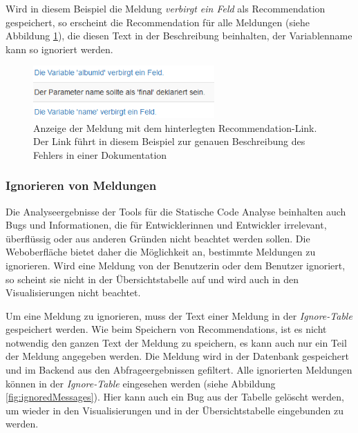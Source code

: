 Wird in diesem Beispiel die Meldung \textit{verbirgt ein Feld} als Recommendation gespeichert, so erscheint die Recommendation für alle Meldungen (siehe Abbildung \ref{fig:recommendations}), die diesen Text in der Beschreibung beinhalten, der Variablenname kann so ignoriert werden. 

\begin{figure}[tp]
  \centering
  \includegraphics[height=2cm]{images/recommendation.PNG}
 \caption[Anzeige der Meldung mit dem hinterlegten Recommendation-Link. Der Link führt in diesem Beispiel zur genauen Beschreibung des Fehlers in einer Dokumentation]{Anzeige der Meldung mit dem hinterlegten Recommendation-Link. Der Link führt in diesem Beispiel zur genauen Beschreibung des Fehlers in einer Dokumentation}
  \label{fig:recommendations}
\end{figure}

\subsubsection{Ignorieren von Meldungen}
Die Analyseergebnisse der Tools für die Statische Code Analyse beinhalten auch Bugs und Informationen, die für Entwicklerinnen und Entwickler irrelevant, überflüssig  oder aus anderen Gründen nicht beachtet werden sollen. Die Weboberfläche bietet daher die Möglichkeit an, bestimmte Meldungen zu ignorieren. Wird eine Meldung von der Benutzerin oder dem Benutzer ignoriert, so scheint sie nicht in der Übersichtstabelle auf und wird auch in den Visualisierungen nicht beachtet. 

Um eine Meldung zu ignorieren, muss der Text einer Meldung in der \textit{Ignore-Table} gespeichert werden. Wie beim Speichern von Recommendations, ist es nicht notwendig den ganzen Text der Meldung zu speichern, es kann auch nur ein Teil der Meldung angegeben werden.  
Die Meldung wird in der Datenbank gespeichert und im Backend aus den Abfrageergebnissen gefiltert. Alle ignorierten Meldungen können in der \textit{Ignore-Table} eingesehen werden (siehe Abbildung \ref{fig:ignoredMessages}). Hier kann auch ein Bug aus der Tabelle gelöscht werden, um wieder in den Visualisierungen und in der Übersichtstabelle eingebunden zu werden.

